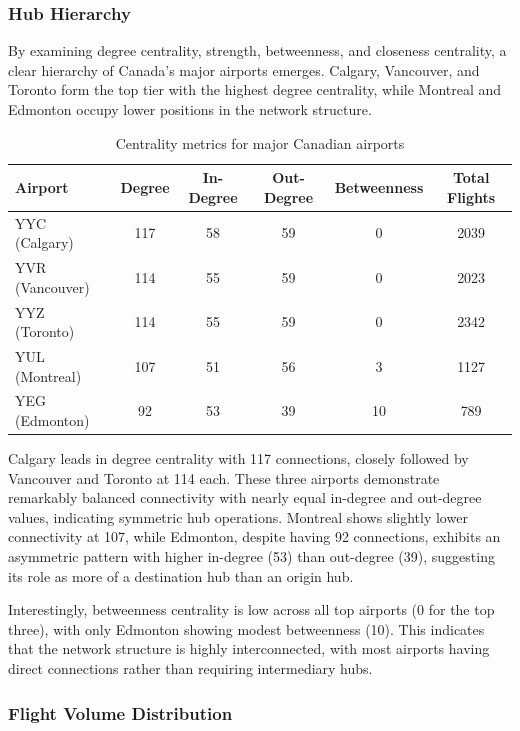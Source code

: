 \documentclass[10pt]{article}
\begin{document}
\subsubsection{Hub Hierarchy}

By examining degree centrality, strength, betweenness, and closeness centrality, a clear hierarchy of Canada's major airports emerges. Calgary, Vancouver, and Toronto form the top tier with the highest degree centrality, while Montreal and Edmonton occupy lower positions in the network structure.

\begin{table}[h!]
    \centering
    \caption{Centrality metrics for major Canadian airports}
    \begin{tabular}{lccccc}
        \toprule
        Airport & Degree & In-Degree & Out-Degree & Betweenness & Total Flights \\
        \midrule
        YYC (Calgary)   & 117 & 58 & 59 & 0  & 2039 \\
        YVR (Vancouver) & 114 & 55 & 59 & 0  & 2023 \\
        YYZ (Toronto)   & 114 & 55 & 59 & 0  & 2342 \\
        YUL (Montreal)  & 107 & 51 & 56 & 3  & 1127 \\
        YEG (Edmonton)  & 92  & 53 & 39 & 10 & 789  \\
        \bottomrule
    \end{tabular}
\end{table}

Calgary leads in degree centrality with 117 connections, closely followed by Vancouver and Toronto at 114 each. These three airports demonstrate remarkably balanced connectivity with nearly equal in-degree and out-degree values, indicating symmetric hub operations. Montreal shows slightly lower connectivity at 107, while Edmonton, despite having 92 connections, exhibits an asymmetric pattern with higher in-degree (53) than out-degree (39), suggesting its role as more of a destination hub than an origin hub.

Interestingly, betweenness centrality is low across all top airports (0 for the top three), with only Edmonton showing modest betweenness (10). This indicates that the network structure is highly interconnected, with most airports having direct connections rather than requiring intermediary hubs.

\subsubsection{Flight Volume Distribution}
\end{document}
